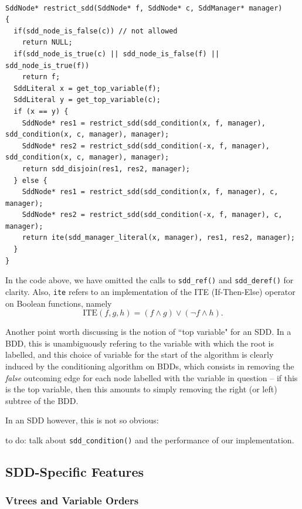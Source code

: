 \documentclass[11pt]{article}
\begin{document}
\begin{lstlisting}[mathescape]

SddNode* restrict_sdd(SddNode* f, SddNode* c, SddManager* manager) 
{
  if(sdd_node_is_false(c)) // not allowed
    return NULL; 
  if(sdd_node_is_true(c) || sdd_node_is_false(f) || sdd_node_is_true(f))
    return f;
  SddLiteral x = get_top_variable(f);
  SddLiteral y = get_top_variable(c);
  if (x == y) {
    SddNode* res1 = restrict_sdd(sdd_condition(x, f, manager), sdd_condition(x, c, manager), manager);
    SddNode* res2 = restrict_sdd(sdd_condition(-x, f, manager), sdd_condition(x, c, manager), manager);
    return sdd_disjoin(res1, res2, manager);
  } else {
    SddNode* res1 = restrict_sdd(sdd_condition(x, f, manager), c, manager);
    SddNode* res2 = restrict_sdd(sdd_condition(-x, f, manager), c, manager);
    return ite(sdd_manager_literal(x, manager), res1, res2, manager);
  }
}

\end{lstlisting}
In the code above, we have omitted the calls to \texttt{sdd\_ref()} and \texttt{sdd\_deref()} for clarity. Also, \texttt{ite} refers to an implementation of the ITE (If-Then-Else) operator on Boolean functions, namely $$\mbox{ITE}(f, g, h) = (f \land g) \lor (\lnot f \land h).$$

Another point worth discussing is the notion of ``top variable" for an SDD. In a BDD, this is unambiguously refering to the variable with which the root is labelled, and this choice of variable for the start of the algorithm is clearly induced by the conditioning algorithm on BDDs, which consists in removing the \textit{false} outcoming edge for each node labelled with the variable in question -- if this is the top variable, then this amounts to simply removing the right (or left) subtree of the BDD. 

In an SDD however, this is not so obvious: 

to do: talk about \texttt{sdd\_condition()} and the performance of our implementation.



\subsection{SDD-Specific Features}

\subsubsection{Vtrees and Variable Orders}
\end{document}
